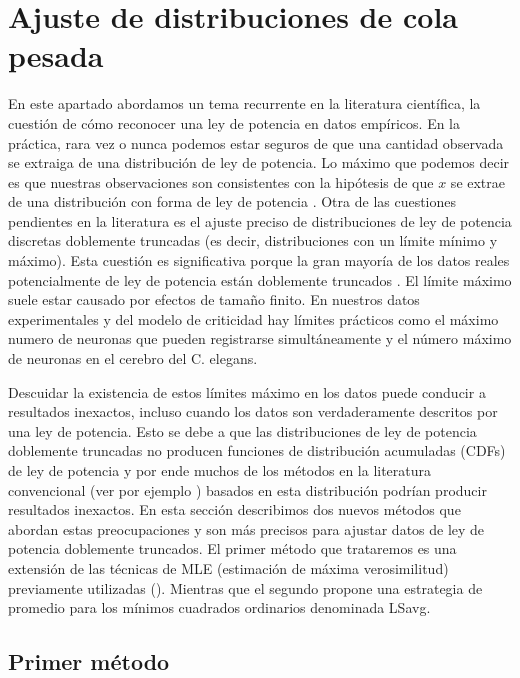  \section{Ajuste de distribuciones de cola pesada}\label{sec:leypotencia}




En este apartado abordamos un tema recurrente en la literatura científica, la cuestión de cómo reconocer una ley de potencia en datos empíricos. En la práctica, rara vez o nunca podemos estar seguros de que una cantidad observada se extraiga de una distribución de ley de potencia. Lo máximo que podemos decir es que nuestras observaciones son consistentes con la hipótesis de que $x$ se extrae de una distribución  con forma de ley de potencia \cite{clauset_power-law_2009}. Otra de las cuestiones pendientes en la literatura es el ajuste preciso de distribuciones de ley de potencia discretas doblemente truncadas (es decir, distribuciones con un límite mínimo y máximo).   Esta cuestión es significativa porque la gran mayoría de los datos reales potencialmente de ley de potencia están doblemente truncados \cite{marshall_analysis_2016}. El límite máximo suele estar causado por efectos de tamaño finito. En nuestros datos experimentales y del modelo de criticidad  hay límites prácticos como el  máximo numero de neuronas que pueden registrarse simultáneamente y  el número máximo de neuronas en el cerebro del C. elegans.


Descuidar la existencia de estos límites máximo en los datos  puede conducir a resultados inexactos, incluso cuando los datos son verdaderamente descritos por una  ley de potencia. Esto se debe a que las distribuciones de ley de potencia doblemente truncadas no producen funciones de distribución acumuladas (CDFs) de ley de potencia y  por ende muchos  de los métodos en la literatura convencional (ver por ejemplo \cite{clauset_power-law_2009})  basados en esta distribución podrían producir  resultados inexactos. En esta sección describimos dos nuevos métodos que abordan estas preocupaciones y son más precisos para ajustar datos de ley de potencia doblemente truncados.  El primer método que trataremos es una extensión  de  las técnicas de MLE (estimación de máxima verosimilitud) previamente utilizadas (\cite{clauset_power-law_2009}).  Mientras que el segundo  propone una estrategia de promedio para los mínimos cuadrados ordinarios denominada LSavg.



\subsection{Primer método}


